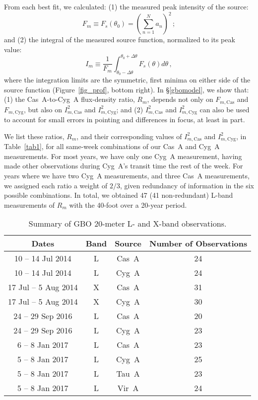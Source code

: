 \documentclass[fleqn,usenatbib]{mnras}
\newcommand{\Imcyg}{\mbox{$I^2_{m,\mathrm{Cyg}}$}}
\newcommand{\Imcas}{\mbox{$I^2_{m,\mathrm{Cas}}$}}
\newcommand{\Fmcyg}{\mbox{$F_{m, \mathrm{Cyg}}$}}
\newcommand{\Fmcas}{\mbox{$F_{m, \mathrm{Cas}}$}}
\begin{document}
From each best fit, we calculated:  (1) the measured peak intensity of the source:
\begin{equation}
F_m\equiv F_s(\theta_0) = \left(\sum_{n=1}^{N}{a_n}\right)^2 \, ;
\end{equation}
\noindent
and (2) the integral of the measured source function, normalized to its peak value:
\begin{equation}\label{eq_Im}
I_m \equiv \frac{1}{F_m}\int_{\theta_0-\Delta\theta}^{\theta_0+\Delta\theta}{F_s(\theta)d\theta} \, ,
\end{equation}
where the integration limits are the symmetric, first minima on either side of the source function (Figure~\ref{fig_prof}, bottom right).  In \S\ref{gbomodel}, we show that:  (1) the Cas~A-to-Cyg~A flux-density ratio, $R_m$, depends not only on $\Fmcas$ and $\Fmcyg$, but also on $\Imcas$ and $\Imcyg$; and (2) $\Imcas$ and $\Imcyg$ can also be used to account for small errors in pointing and differences in focus, at least in part.

We list these ratios, $R_m$, and their corresponding values of $\Imcas$ and $\Imcyg$, in Table~\ref{tab1}, for all same-week combinations of our Cas~A and Cyg~A measurements.  For most years, we have only one Cyg~A measurement, having made other observations during Cyg~A's transit time the rest of the week.  For years where we have two Cyg~A measurements, and three Cas~A measurements, we assigned each ratio a weight of $2/3$, given redundancy of information in the six possible combinations.  In total, we obtained 47 (41 non-redundant) L-band measurements of $R_m$ with the 40-foot over a 20-year period.

\begin{table}
\caption{Summary of GBO 20-meter L- and X-band observations.}\label{tab2}
\centering
\begin{tabular}{c c c c}
\hline 
\hline 
Dates & Band & Source & Number of Observations \\
\hline 
\hline 
10 -- 14 Jul 2014 &  L  &  Cas~A  &  24	\\
10 -- 14 Jul 2014 &  L  &  Cyg~A  &  24 \\
17 Jul -- 5 Aug 2014 &  X  &  Cas~A  &  31	\\
17 Jul -- 5 Aug 2014 &  X  &  Cyg~A  &  30 \\
24 -- 29 Sep 2016 &  L  &  Cas~A  &  20	\\
24 -- 29 Sep 2016 &  L  &  Cyg~A  &  23 \\
6 -- 8 Jan 2017 &  L  &  Cas~A  &  23	\\
5 -- 8 Jan 2017 &  L  &  Cyg~A  &  25 \\
5 -- 8 Jan 2017 &  L  &  Tau~A  &  23	\\
5 -- 8 Jan 2017 &  L  &  Vir~A  &  24 \\
\hline 
\end{tabular}
\end{table}
\end{document}
